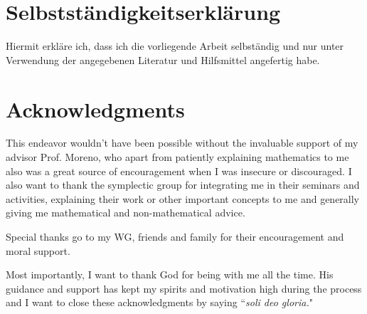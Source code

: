 \section*{Selbstständigkeitserklärung}

Hiermit erkläre ich, dass ich die vorliegende Arbeit selbständig und nur unter
Verwendung der angegebenen Literatur und Hilfsmittel angefertig habe.

\newpage

\section*{Acknowledgments}

This endeavor wouldn't have been possible without the invaluable support of my advisor Prof. Moreno, who apart from patiently explaining mathematics to me
also was a great source of encouragement when I was insecure or discouraged.
I also want to thank the symplectic group for integrating me in their seminars and activities, explaining their work or other important concepts to me
and generally giving me mathematical and non-mathematical advice.

Special thanks go to my WG, friends and family for their encouragement and moral support. 

Most importantly, I want to thank God for being with me all the time. 
His guidance and support has kept my spirits and motivation high during the process and I want to close these acknowledgments by saying 
``\textit{soli deo gloria.}"
\newpage